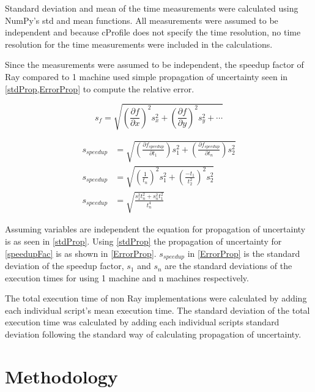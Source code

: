 \documentclass[12pt, a4paper]{article}
\begin{document}
Standard deviation and mean of the time measurements were calculated using NumPy's std and mean functions.
All measurements were assumed to be independent and because cProfile does not specify the time resolution, no time resolution for the time measurements were included in the calculations.

Since the measurements were assumed to be independent, the speedup factor of Ray compared to 1 machine used simple propagation of uncertainty seen in \cref{stdProp,ErrorProp} to compute the relative error.

\begin{equation}\label{stdProp}
    s_f = \sqrt{\left(\frac{\partial f}{\partial x}\right)^2s_x^2 + \left(\frac{\partial f}{\partial y}\right)^2s_y^2 + \cdots}
\end{equation}

\begin{equation}\label{ErrorProp}
    \begin{aligned}
        s_{speedup} &=  \sqrt{\left(\frac{\partial f_{speedup}}{\partial t_1}\right)s_1^2 + \left(\frac{\partial f_{speedup}}{\partial t_n}\right)s_2^2} \\
        s_{speedup} &= \sqrt{\left(\frac{1}{t_n}\right)^2s_1^2 + \left(\frac{-t_1}{t_2^2}\right)^2s_2^2}\\
        s_{speedup} &= \sqrt{\frac{s_{1}^2t_n^2 + s_{n}^2t_1^2}{t_n^4}}
    \end{aligned}
\end{equation}

Assuming variables are independent the equation for propagation of uncertainty is as seen in \cref{stdProp}.
Using \cref{stdProp} the propagation of uncertainty for \cref{speedupFac} is as shown in \cref{ErrorProp}.
$s_{speedup}$ in \cref{ErrorProp} is the standard deviation of the speedup factor, $s_1$ and $s_n$ are the standard deviations of the execution times for using 1 machine and n machines respectively.

The total execution time of non Ray implementations were calculated by adding each individual script's mean execution time.
The standard deviation of the total execution time was calculated by adding each individual scripts standard deviation following the standard way of calculating propagation of uncertainty.

\section{Methodology}
\end{document}
